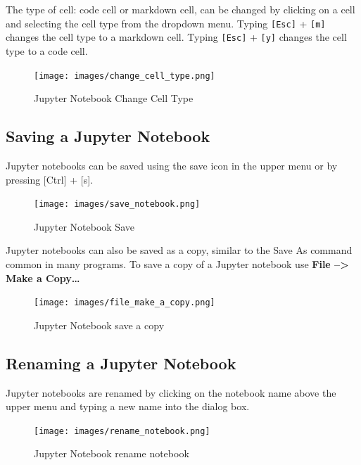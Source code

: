 \documentclass{book}
\begin{document}
The type of cell: code cell or markdown cell, can be changed by clicking
on a cell and selecting the cell type from the dropdown menu. Typing
\lstinline![Esc]! + \lstinline![m]! changes the cell type to a markdown
cell. Typing \lstinline![Esc]! + \lstinline![y]! changes the cell type
to a code cell.

\begin{figure}
\centering
\texttt{[image: images/change\_cell\_type.png]}
\caption{Jupyter Notebook Change Cell Type}
\end{figure}
    




    
        \subsection{Saving a Jupyter Notebook}\label{saving-a-jupyter-notebook}

Jupyter notebooks can be saved using the save icon in the upper menu or
by pressing {[}Ctrl{]} + {[}s{]}.

\begin{figure}
\centering
\texttt{[image: images/save\_notebook.png]}
\caption{Jupyter Notebook Save}
\end{figure}

Jupyter notebooks can also be saved as a copy, similar to the Save As
command common in many programs. To save a copy of a Jupyter notebook
use \textbf{File --\textgreater{} Make a Copy\ldots{}}

\begin{figure}
\centering
\texttt{[image: images/file\_make\_a\_copy.png]}
\caption{Jupyter Notebook save a copy}
\end{figure}
    




    
        \subsection{Renaming a Jupyter
Notebook}\label{renaming-a-jupyter-notebook}

Jupyter notebooks are renamed by clicking on the notebook name above the
upper menu and typing a new name into the dialog box.

\begin{figure}
\centering
\texttt{[image: images/rename\_notebook.png]}
\caption{Jupyter Notebook rename notebook}
\end{figure}
\end{document}
